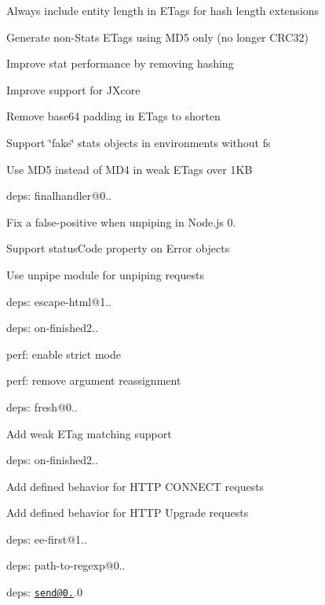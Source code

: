 \begin{DoxyItemize}
{\begin{DoxyItemize}
\item Always include entity length in E\+Tags for hash length extensions
\item Generate non-\/\+Stats E\+Tags using M\+D5 only (no longer C\+R\+C32)
\item Improve stat performance by removing hashing
\item Improve support for J\+Xcore
\item Remove base64 padding in E\+Tags to shorten
\item Support \char`\"{}fake\char`\"{} stats objects in environments without fs
\item Use M\+D5 instead of M\+D4 in weak E\+Tags over 1\+KB
\end{DoxyItemize}}
\item {\ttfamily deps\+: finalhandler@0..
\begin{DoxyItemize}
\item Fix a false-\/positive when unpiping in Node.\+js 0.
\item Support {\ttfamily status\+Code} property on {\ttfamily Error} objects
\item Use {\ttfamily unpipe} module for unpiping requests
\item deps\+: escape-\/html@1..
\item deps\+: on-\/finished2..
\item perf\+: enable strict mode
\item perf\+: remove argument reassignment
\end{DoxyItemize}}
\item {\ttfamily deps\+: fresh@0..
\begin{DoxyItemize}
\item Add weak {\ttfamily E\+Tag} matching support
\end{DoxyItemize}}
\item {\ttfamily deps\+: on-\/finished2..
\begin{DoxyItemize}
\item Add defined behavior for H\+T\+TP {\ttfamily C\+O\+N\+N\+E\+CT} requests
\item Add defined behavior for H\+T\+TP {\ttfamily Upgrade} requests
\item deps\+: ee-\/first@1..
\end{DoxyItemize}}
\item {\ttfamily deps\+: path-\/to-\/regexp@0..}
\item {\ttfamily deps\+: \href{mailto:send@0.13}{\tt send@0.}.0
}
\end{DoxyItemize}
